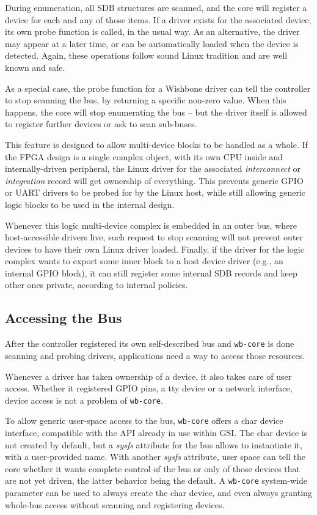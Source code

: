 \documentclass[a4paper, 12pt]{article}
\begin{document}
During enumeration, all SDB structures are scanned, and the core will
register a device for each and any of those items.  If a driver exists
for the associated device, its own probe function is called, in the
usual way.  As an alternative, the driver may appear at a later time,
or can be automatically loaded when the device is detected. Again, these
operations follow sound Linux tradition and are well known and safe.

As a special case, the probe function for a Wishbone driver can tell
the controller to stop scanning the bus, by
returning a specific non-zero value.  When this happens, the core will stop
enumerating the bus -- but the driver itself is allowed to register
further devices or ask to scan sub-buses.

This feature is designed to allow multi-device blocks to be handled as
a whole.  If the FPGA design is a single complex object, with its own
CPU inside and internally-driven peripheral, the Linux driver for the
associated \textit{interconnect} or \textit{integration} record will
get ownership of everything.  This prevents generic GPIO or UART
drivers to be probed for by the Linux host, while
still allowing generic logic blocks to be used in the internal design.

Whenever this logic multi-device complex is embedded in an outer bus, where
host-accessible drivers live, such request to stop scanning will not
prevent outer devices to have their own Linux driver loaded.  Finally,
if the driver for the logic complex wants to export some inner block
to a host device driver (e.g., an internal GPIO block), it can still
register some internal SDB records and keep other ones private,
according to internal policies.


\subsection{Accessing the Bus}

After the controller registered its own self-described bus and
\texttt{wb-core} is done scanning and probing drivers, applications
need a way to access those resources.

Whenever a driver has taken ownership of a device, it also takes
care of user access. Whether it registered GPIO pins, a tty device
or a network interface, device access is not a problem of \texttt{wb-core}.

To allow generic user-space access to the bus, \texttt{wb-core} offers
a char device interface, compatible with the API already in use within
GSI.  The char device is not created by default, but a \textit{sysfs}
attribute for the bus allows to instantiate it, with a user-provided
name.  With another \textit{sysfs} attribute, user space can tell the
core whether it wants complete control of the bus or only of those
devices that are not yet driven, the latter behavior being the
default.  A \texttt{wb-core} system-wide parameter can be used to always
create the char device, and even always granting whole-bus access
without scanning and registering devices.
\end{document}
